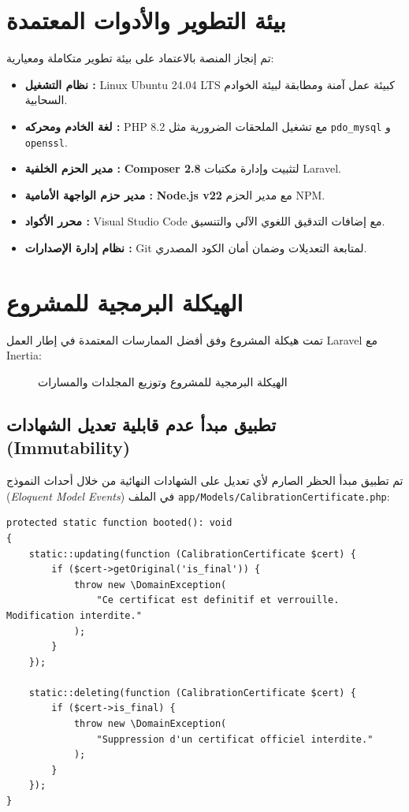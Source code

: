\documentclass{bts-report-ar}
\begin{document}
\section{بيئة التطوير والأدوات المعتمدة}
تم إنجاز المنصة بالاعتماد على بيئة تطوير متكاملة ومعيارية:
\begin{itemize}
  \item \textbf{نظام التشغيل :} Linux Ubuntu 24.04 LTS كبيئة عمل آمنة ومطابقة لبيئة الخوادم السحابية.
  \item \textbf{لغة الخادم ومحركه :} PHP 8.2 مع تشغيل الملحقات الضرورية مثل \texttt{pdo\_mysql} و \texttt{openssl}.
  \item \textbf{مدير الحزم الخلفية :} \textbf{Composer 2.8} لتثبيت وإدارة مكتبات Laravel.
  \item \textbf{مدير حزم الواجهة الأمامية :} \textbf{Node.js v22} مع مدير الحزم NPM.
  \item \textbf{محرر الأكواد :} Visual Studio Code مع إضافات التدقيق اللغوي الآلي والتنسيق.
  \item \textbf{نظام إدارة الإصدارات :} Git لمتابعة التعديلات وضمان أمان الكود المصدري.
\end{itemize}

\section{الهيكلة البرمجية للمشروع}
تمت هيكلة المشروع وفق أفضل الممارسات المعتمدة في إطار العمل Laravel مع Inertia:

\begin{figure}[H]
  \centering
  \begin{LTR}
  
  \end{LTR}
  \caption{الهيكلة البرمجية للمشروع وتوزيع المجلدات والمسارات}
  \label{fig:app-structure}
\end{figure}

\subsection{تطبيق مبدأ عدم قابلية تعديل الشهادات (Immutability)}
تم تطبيق مبدأ الحظر الصارم لأي تعديل على الشهادات النهائية من خلال أحداث النموذج (\textit{Eloquent Model Events}) في الملف \texttt{app/Models/CalibrationCertificate.php}:
\begin{LTR}
\begin{verbatim}
protected static function booted(): void
{
    static::updating(function (CalibrationCertificate $cert) {
        if ($cert->getOriginal('is_final')) {
            throw new \DomainException(
                "Ce certificat est definitif et verrouille. Modification interdite."
            );
        }
    });

    static::deleting(function (CalibrationCertificate $cert) {
        if ($cert->is_final) {
            throw new \DomainException(
                "Suppression d'un certificat officiel interdite."
            );
        }
    });
}
\end{verbatim}
\end{LTR}
\end{document}
